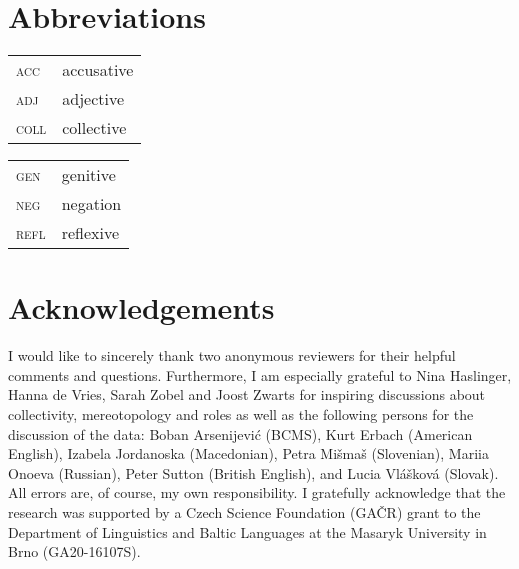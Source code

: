 \documentclass[output=paper]{langscibook}
\begin{document}
\section*{Abbreviations}


\begin{tabularx}{.5\textwidth}{@{}lX@{}}
\textsc{acc}&{accusative}\\
\textsc{adj}&{adjective}\\
\textsc{coll}&{collective}\\
\end{tabularx}%
\begin{tabularx}{.5\textwidth}{@{}lX@{}}
\textsc{gen}&{genitive}\\
\textsc{neg}&{negation}\\
\textsc{refl}&{reflexive}\\
\end{tabularx}

\section*{Acknowledgements}

I would like to sincerely thank two anonymous reviewers for their helpful comments and questions. Furthermore, I am especially grateful to Nina Haslinger, Hanna de Vries, Sarah Zobel and Joost Zwarts for inspiring discussions about collectivity, mereotopology and roles as well as the following persons for the discussion of the data: Boban Arsenijević (BCMS), Kurt Erbach (American English), Izabela Jordanoska (Macedonian), Petra Mišmaš (Slovenian), Mariia Onoeva (Russian), Peter Sutton (British English), and Lucia Vlášková (Slovak). All errors are, of course, my own responsibility. I gratefully acknowledge that the research was supported by a Czech Science Foundation (GAČR) grant to the Department of Linguistics and Baltic Languages at the Masaryk University in Brno (GA20-16107S).

{\sloppy\printbibliography[heading=subbibliography,notkeyword=this]}
\end{document}
